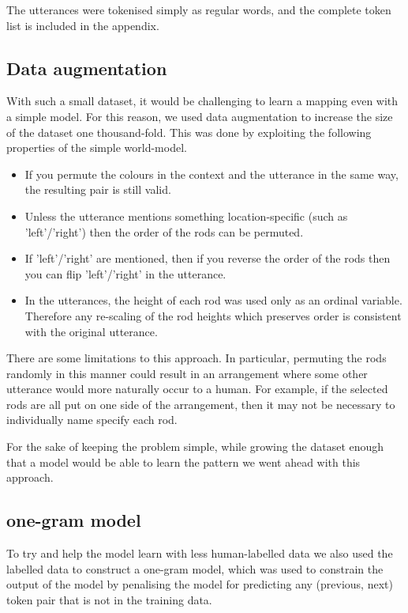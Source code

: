 The utterances were tokenised simply as regular words, and the complete token list is included in the appendix.

\subsection{Data augmentation}

With such a small dataset, it would be challenging to learn a mapping even with a simple model. For this reason, we used data augmentation to increase the size of the dataset one thousand-fold. This was done by exploiting the following properties of the simple world-model.

\begin{itemize}
\item If you permute the colours in the context and the utterance in the same way, the resulting pair is still valid.
\item Unless the utterance mentions something location-specific (such as 'left'/'right') then the order of the rods can be permuted.
\item If 'left'/'right' are mentioned, then if you reverse the order of the rods then you can flip 'left'/'right' in the utterance.
\item In the utterances, the height of each rod was used only as an ordinal variable. Therefore any re-scaling of the rod heights which preserves order is consistent with the original utterance.
\end{itemize}

There are some limitations to this approach. In particular, permuting the rods randomly in this manner could result in an arrangement where some other utterance would more naturally occur to a human. For example, if the selected rods are all put on one side of the arrangement, then it may not be necessary to individually name specify each rod.

For the sake of keeping the problem simple, while growing the dataset enough that a model would be able to learn the pattern we went ahead with this approach.

\subsection{one-gram model}

To try and help the model learn with less human-labelled data we also used the labelled data to construct a one-gram model, which was used to constrain the output of the model by penalising the model for predicting any (previous, next) token pair that is not in the training data.

